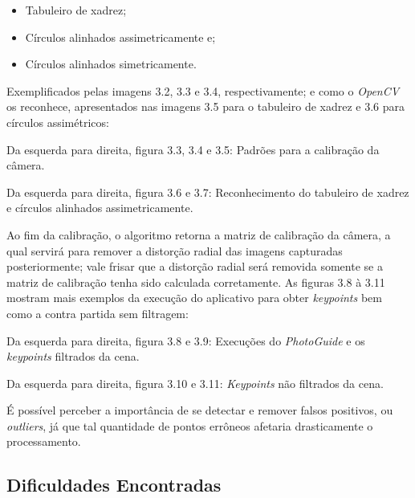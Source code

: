 \begin{itemize}
	\item{Tabuleiro de xadrez;}
	\item{Círculos alinhados assimetricamente e;}
	\item{Círculos alinhados simetricamente.}
\end{itemize}

Exemplificados pelas imagens 3.2, 3.3 e 3.4, respectivamente; e como o \textit{OpenCV} os reconhece, apresentados nas imagens 3.5 para o tabuleiro de xadrez e 3.6 para círculos assimétricos:

Da esquerda para direita, figura 3.3, 3.4 e 3.5: Padrões para a calibração da câmera.


Da esquerda para direita, figura 3.6 e 3.7: Reconhecimento do tabuleiro de xadrez e círculos alinhados assimetricamente.

Ao fim da calibração, o algoritmo retorna a matriz de calibração da câmera, a qual servirá para remover a distorção radial das imagens capturadas posteriormente; vale frisar que a distorção radial será removida somente se  a matriz de calibração tenha sido calculada corretamente. As figuras 3.8 à 3.11 mostram mais exemplos da execução do aplicativo para obter \textit{keypoints} bem como a contra partida sem filtragem:


Da esquerda para direita, figura 3.8 e 3.9: Execuções do \textit{PhotoGuide} e os \textit{keypoints} filtrados da cena.


Da esquerda para direita, figura 3.10 e 3.11: \textit{Keypoints} não filtrados da cena.

É possível perceber a importância de se detectar e remover falsos positivos, ou \textit{outliers}, já que tal quantidade de pontos errôneos afetaria drasticamente o processamento.

\subsection{Dificuldades Encontradas}

